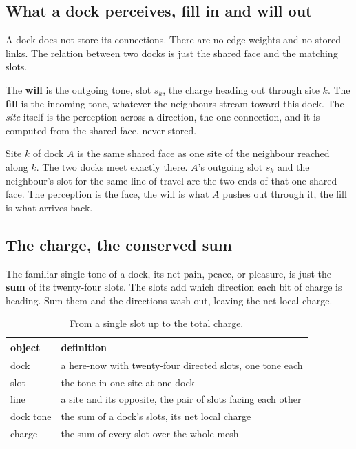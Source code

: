 \subsection{What a dock perceives, fill in and will out}

A dock does not store its connections. There are no edge weights and no stored links. The relation between two docks is just the shared face and the matching slots.

The \textbf{will} is the outgoing tone, slot $s_k$, the charge heading out through site $k$. The \textbf{fill} is the incoming tone, whatever the neighbours stream toward this dock. The \emph{site} itself is the perception across a direction, the one connection, and it is computed from the shared face, never stored.

Site $k$ of dock $A$ is the same shared face as one site of the neighbour reached along $k$. The two docks meet exactly there. $A$'s outgoing slot $s_k$ and the neighbour's slot for the same line of travel are the two ends of that one shared face. The perception is the face, the will is what $A$ pushes out through it, the fill is what arrives back.

\subsection{The charge, the conserved sum}

The familiar single tone of a dock, its net pain, peace, or pleasure, is just the \textbf{sum} of its twenty-four slots. The slots add which direction each bit of charge is heading. Sum them and the directions wash out, leaving the net local charge.

\begin{table}[ht]
\centering
\begin{tabular}{@{}ll@{}}
\toprule
object & definition \\
\midrule
dock & a here-now with twenty-four directed slots, one tone each \\
slot & the tone in one site at one dock \\
line & a site and its opposite, the pair of slots facing each other \\
dock tone & the sum of a dock's slots, its net local charge \\
charge & the sum of every slot over the whole mesh \\
\bottomrule
\end{tabular}
\caption{From a single slot up to the total charge.}
\label{tab:charge-ladder}
\end{table}

